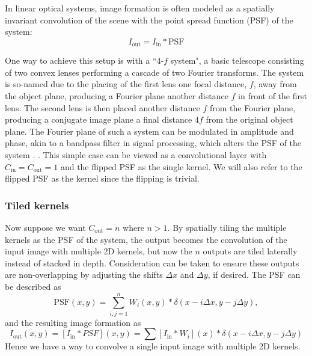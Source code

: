 In linear optical systems, image formation is often modeled as a spatially invariant convolution of the scene with the point spread function (PSF) of the system:
\begin{equation}
I_\text{out}  = I_\text{in} * \text{PSF}
\end{equation}

One way to achieve this setup is with a ``4-$f$ system", a basic telescope consisting of two convex lenses performing a cascade of two Fourier transforms. The system is so-named due to the placing of the first lens one focal distance, $f$, away from the object plane, producing a Fourier plane another distance $f$ in front of the first lens. The second lens is then placed another distance $f$ from the Fourier plane, producing a conjugate image plane a final distance $4f$ from the original object plane. The Fourier plane of such a system can be modulated in amplitude and phase, akin to a bandpass filter in signal processing, which alters the PSF of the system \cite{goodman2008introduction}. . This simple case can be viewed as a convolutional layer with $C_\text{in} = C_\text{out} = 1$ and the flipped PSF as the single kernel. We will also refer to the flipped PSF as the kernel since the flipping is trivial. 

\subsubsection{Tiled kernels} Now suppose we want $C_\text{out} = n$ where $n >1$. By spatially tiling the multiple kernels as the PSF of the system, the output becomes the convolution of the input image with multiple 2D kernels, but now the $n$ outputs are tiled laterally instead of stacked in depth. Consideration can be taken to ensure these outputs are non-overlapping by adjusting the shifts $\Delta x$ and $\Delta y$, if desired. The PSF can be described as
\begin{equation}
\text{PSF}(x,y) = \sum_{i,j = 1}^n W_i (x,y) * \delta(x - i\Delta x, y - j\Delta y),
\end{equation}
and the resulting image formation as
\begin{equation}
I_\text{out}(x,y) = [I_\text{in} * PSF](x,y) = \sum [I_\text{in} * W_i](x) * \delta(x - i\Delta x, y - j \Delta y)
\end{equation}
Hence we have a way to convolve a single input image with multiple 2D kernels.

